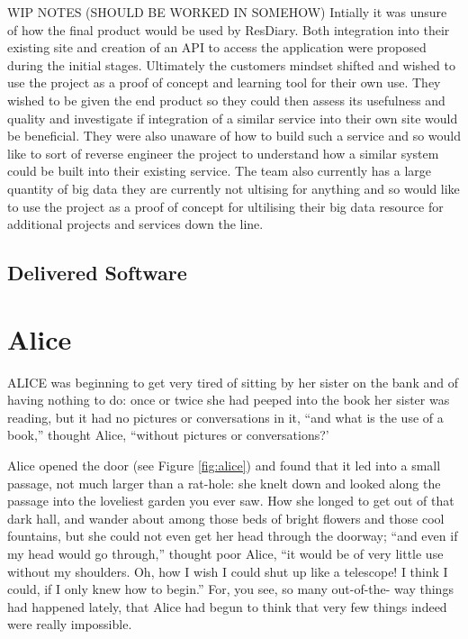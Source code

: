\documentclass{l3proj}
\begin{document}
WIP NOTES (SHOULD BE WORKED IN SOMEHOW)
Intially it was unsure of how the final product would be used by ResDiary. 
Both integration into their existing site and creation of an API to access the application were proposed during the initial stages. 
Ultimately the customers mindset shifted and wished to use the project as a proof of concept and learning tool for their own use.
They wished to be given the end product so they could then assess its usefulness and quality and investigate if integration of a similar service into their own site would be beneficial.
They were also unaware of how to build such a service and so would like to sort of reverse engineer the project to understand how a similar system could be built into their existing service.
The team also currently has a large quantity of big data they are currently not ultising for anything and so would like to use the project as a proof of concept for ultilising their big data resource for additional projects and services down the line.

\subsection{Delivered Software}
\label{finsoftware}

\newpage

\section{Alice}
\label{sec:alice}

ALICE \cite{alice} was beginning to get very tired of sitting by her sister
on the bank and of having nothing to do: once or twice she had peeped into
the book her sister was reading, but it had no pictures or conversations in
it, ``and what is the use of a book,'' thought Alice, ``without pictures or
conversations?'



Alice opened the door (see Figure \ref{fig:alice}) and found that it
led into a small passage, not much larger than a rat-hole: she knelt
down and looked along the passage into the loveliest garden you ever
saw. How she longed to get out of that dark hall, and wander about
among those beds of bright flowers and those cool fountains, but she
could not even get her head through the doorway; ``and even if my head
would go through,'' thought poor Alice, ``it would be of very little
use without my shoulders. Oh, how I wish I could shut up like a
telescope! I think I could, if I only knew how to begin.'' For, you
see, so many out-of-the- way things had happened lately, that Alice
had begun to think that very few things indeed were really impossible.
\end{document}
